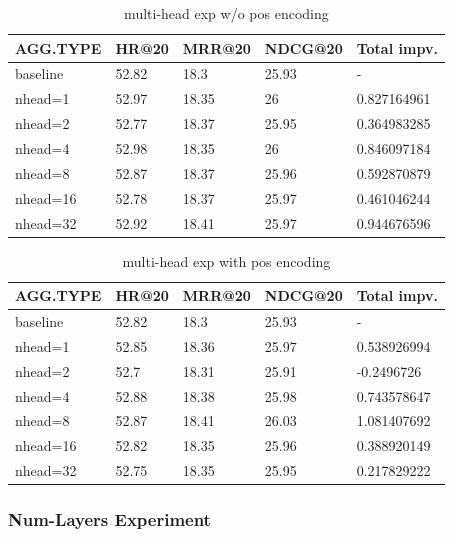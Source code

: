 \documentclass{article}
\begin{document}
\begin{table}
    \caption{multi-head exp w/o pos encoding}
    \label{multi-head exp w/o pos encoding}
    \centering
    \begin{tabular}{lllll}
        \toprule
        AGG.TYPE & HR@20 & MRR@20 & NDCG@20 & Total impv. \\
        \midrule
        baseline & 52.82 & 18.3   & 25.93   & -           \\
        nhead=1  & 52.97 & 18.35  & 26      & 0.827164961 \\
        nhead=2  & 52.77 & 18.37  & 25.95   & 0.364983285 \\
        nhead=4  & 52.98 & 18.35  & 26      & 0.846097184 \\
        nhead=8  & 52.87 & 18.37  & 25.96   & 0.592870879 \\
        nhead=16 & 52.78 & 18.37  & 25.97   & 0.461046244 \\
        nhead=32 & 52.92 & 18.41  & 25.97   & 0.944676596 \\
        \bottomrule
    \end{tabular}
\end{table}

\begin{table}
    \caption{multi-head exp with pos encoding}
    \label{multi-head exp with pos encoding}
    \centering
    \begin{tabular}{lllll}
        \toprule
        AGG.TYPE & HR@20 & MRR@20 & NDCG@20 & Total impv. \\
        \midrule
        baseline & 52.82 & 18.3   & 25.93   & -           \\
        nhead=1  & 52.85 & 18.36  & 25.97   & 0.538926994 \\
        nhead=2  & 52.7  & 18.31  & 25.91   & -0.2496726  \\
        nhead=4  & 52.88 & 18.38  & 25.98   & 0.743578647 \\
        nhead=8  & 52.87 & 18.41  & 26.03   & 1.081407692 \\
        nhead=16 & 52.82 & 18.35  & 25.96   & 0.388920149 \\
        nhead=32 & 52.75 & 18.35  & 25.95   & 0.217829222 \\
        \bottomrule
    \end{tabular}
\end{table}

\subsubsection{Num-Layers Experiment}
\end{document}
